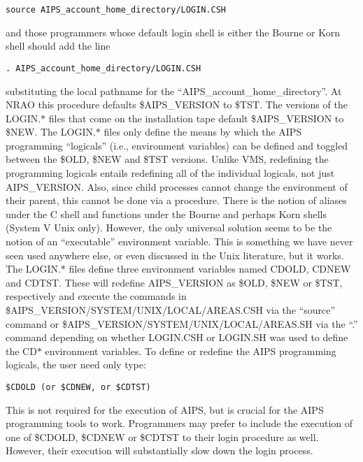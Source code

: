 \begin{verbatim}
source AIPS_account_home_directory/LOGIN.CSH

\end{verbatim}
and those programmers whose default login shell is either the Bourne
or Korn shell should add the line

\begin{verbatim}
. AIPS_account_home_directory/LOGIN.CSH

\end{verbatim}
substituting the local pathname for the
``AIPS\_account\_home\_directory''. At NRAO this procedure defaults
\$AIPS\_VERSION to \$TST.  The versions of the LOGIN.$\ast$ files that
come on the installation tape default \$AIPS\_VERSION to \$NEW.  The
LOGIN.$\ast$ files only define the means by which the AIPS programming
``logicals'' (i.e., environment variables) can be defined and toggled
between the \$OLD, \$NEW and \$TST versions. Unlike VMS, redefining
the programming logicals entails redefining all of the individual
logicals, not just AIPS\_VERSION.  Also, since child processes cannot
change the environment of their parent, this cannot be done via a
procedure.  There is the notion of aliases under the C shell and
functions under the Bourne and perhaps Korn shells (System V Unix
only). However, the only universal solution seems to be the notion of
an ``executable'' environment variable.  This is something we have never
seen used anywhere else, or even discussed in the Unix literature, but
it works.  The LOGIN.$\ast$ files define three environment variables named
CDOLD, CDNEW and CDTST.  These will redefine AIPS\_VERSION as \$OLD,
\$NEW or \$TST, respectively and execute the commands in
\$AIPS\_VERSION/SYSTEM/UNIX/LOCAL/AREAS.CSH via the ``source'' command
or \$AIPS\_VERSION/SYSTEM/UNIX/LOCAL/AREAS.SH via the ``.'' command
depending on whether LOGIN.CSH or LOGIN.SH was used to define the CD$\ast$
environment variables.  To define or redefine the AIPS programming
logicals, the user need only type:

\begin{verbatim}
$CDOLD (or $CDNEW, or $CDTST)

\end{verbatim}
This is not required for the execution of AIPS, but is crucial for the
AIPS programming tools to work.  Programmers may prefer to include the
execution of one of \$CDOLD, \$CDNEW or \$CDTST to their login
procedure as well.  However, their execution will substantially slow
down the login process.


